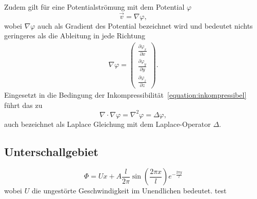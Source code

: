 Zudem gilt für eine Potentialströmung mit dem Potential $\varphi$
\begin{equation}
    \vec{v} = \nabla\varphi,
\end{equation}
wobei $\nabla\varphi$ auch als Gradient des Potential bezeichnet wird
und bedeutet nichts geringeres als die Ableitung in jede Richtung
\begin{align}
    \nabla\varphi
    =
    \begin{pmatrix}
        \frac{\partial \varphi_x}{\partial x}\\
        \frac{\partial \varphi_y}{\partial y}\\
        \frac{\partial \varphi_z}{\partial z}
    \end{pmatrix}.
\end{align} 
Eingesetzt in die Bedingung der Inkompressibilität~\ref{equation:inkompressibel}
führt das zu
\begin{equation}
    \nabla \cdot \nabla \varphi
    = 
    \nabla^2 \varphi
    =
    \Delta\varphi,
\end{equation}
auch bezeichnet als Laplace Gleichung mit dem Laplace-Operator $\Delta$.



\subsection{Unterschallgebiet\label{ueberschall:subsection:unterschallgebiet}}
\begin{equation}
    \Phi
    =
    Ux + A \frac{l}{2\pi}
    \sin(\frac{2\pi x}{l})
    e^{-\frac{2\pi y}{l}}
\end{equation}
wobei $U$ die ungestörte Geschwindigkeit im Unendlichen bedeutet.
test